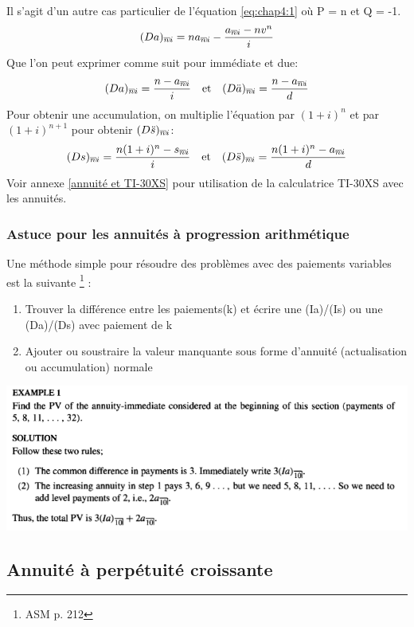 \documentclass[11pt,french]{report}
\makeatletter
\DeclareRobustCommand{\annuity}[1]{%
\def\arraystretch{0}%
\setlength\arraycolsep{.7pt}%
\setlength\arrayrulewidth{.3pt}%
\begin{array}[b]{@{}c|}\hline
\\[\arraycolsep]%
\scriptstyle #1%
\end{array}%
}
\makeatother
\begin{document}
Il s'agit d'un autre cas particulier de l'équation \ref{eq:chap4:1} où P = n et  Q = -1.
\begin{equation}
(Da)_{\annuity{n}i} = na_{\annuity{n}i} - \frac{a_{\annuity{n}i} - nv^{n}}{i} 
\end{equation}
Que l'on peut exprimer comme suit pour immédiate et due:
\begin{equation}
 (Da)_{\annuity{n}i} = \frac{n - a_{\annuity{n}i}}{i} \quad \text{et} \quad  (D\ddot{a})_{\annuity{n}i} = \frac{n -a_{\annuity{n}i}}{d}
\end{equation}
Pour obtenir une accumulation, on multiplie l'équation par $(1+i)^n $ et par $(1+i)^{n+1}$ pour obtenir $(D\ddot{s})_{\annuity{n}i} $:
\begin{equation}
(Ds)_{\annuity{n}i} = \frac{n(1+i)^n - s_{\annuity{n}i}}{i} \quad \text{et} \quad  (D\ddot{s})_{\annuity{n}i} = \frac{n(1+i)^n -a_{\annuity{n}i}}{d} 
\end{equation}
Voir annexe \ref{annuité et TI-30XS} pour utilisation de la calculatrice TI-30XS avec les annuités.

\subsubsection{Astuce pour les annuités à progression arithmétique}
Une méthode simple pour résoudre des problèmes avec des paiements variables est la suivante \footnote{ASM p. 212} :
\begin{enumerate}
\item Trouver la différence entre les paiements(k) et écrire une (Ia)/(Is) ou une (Da)/(Ds) avec paiement de k
\item Ajouter ou soustraire la valeur manquante sous forme d'annuité (actualisation ou accumulation) normale
\end{enumerate}
\includegraphics[scale=0.61]{picture6.PNG}

\subsection{Annuité à perpétuité croissante}
\label{Increasing perpetuities}
\end{document}
